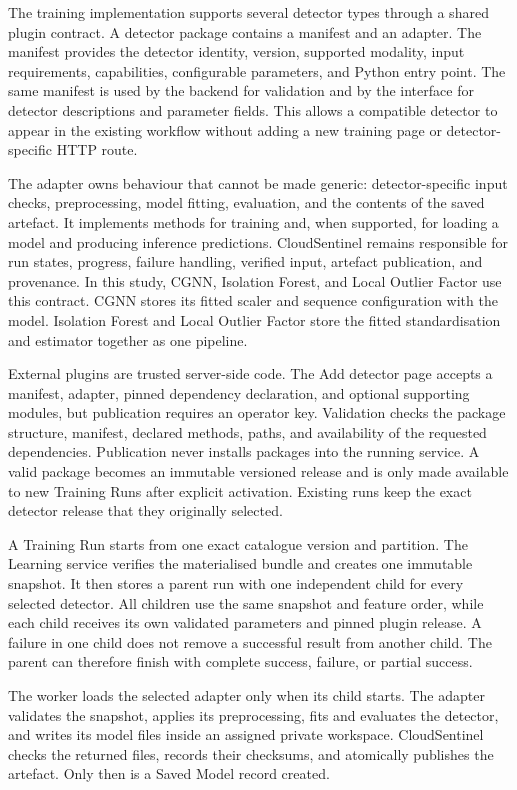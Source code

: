 The training implementation supports several detector types through a shared plugin contract. A detector package contains a manifest and an adapter. The manifest provides the detector identity, version, supported modality, input requirements, capabilities, configurable parameters, and Python entry point. The same manifest is used by the backend for validation and by the interface for detector descriptions and parameter fields. This allows a compatible detector to appear in the existing workflow without adding a new training page or detector-specific HTTP route.

The adapter owns behaviour that cannot be made generic: detector-specific input checks, preprocessing, model fitting, evaluation, and the contents of the saved artefact. It implements methods for training and, when supported, for loading a model and producing inference predictions. CloudSentinel remains responsible for run states, progress, failure handling, verified input, artefact publication, and provenance. In this study, CGNN, Isolation Forest, and Local Outlier Factor use this contract. CGNN stores its fitted scaler and sequence configuration with the model. Isolation Forest and Local Outlier Factor store the fitted standardisation and estimator together as one pipeline.

External plugins are trusted server-side code. The Add detector page accepts a manifest, adapter, pinned dependency declaration, and optional supporting modules, but publication requires an operator key. Validation checks the package structure, manifest, declared methods, paths, and availability of the requested dependencies. Publication never installs packages into the running service. A valid package becomes an immutable versioned release and is only made available to new Training Runs after explicit activation. Existing runs keep the exact detector release that they originally selected.

A Training Run starts from one exact catalogue version and partition. The Learning service verifies the materialised bundle and creates one immutable snapshot. It then stores a parent run with one independent child for every selected detector. All children use the same snapshot and feature order, while each child receives its own validated parameters and pinned plugin release. A failure in one child does not remove a successful result from another child. The parent can therefore finish with complete success, failure, or partial success.

The worker loads the selected adapter only when its child starts. The adapter validates the snapshot, applies its preprocessing, fits and evaluates the detector, and writes its model files inside an assigned private workspace. CloudSentinel checks the returned files, records their checksums, and atomically publishes the artefact. Only then is a Saved Model record created.

